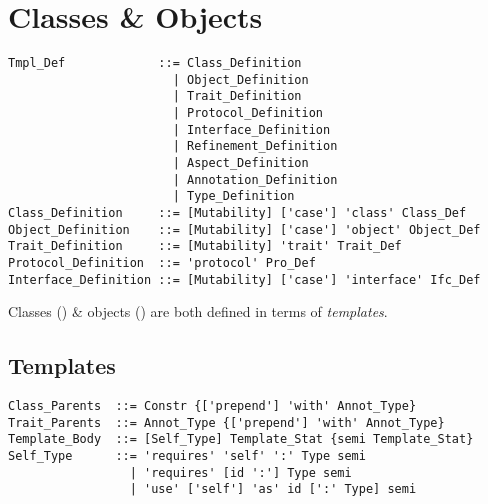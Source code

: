 
\chapter{Classes \& Objects}

\minitoc

\newpage

\syntax\begin{lstlisting}
Tmpl_Def             ::= Class_Definition
                       | Object_Definition
                       | Trait_Definition
                       | Protocol_Definition
                       | Interface_Definition
                       | Refinement_Definition
                       | Aspect_Definition
                       | Annotation_Definition
                       | Type_Definition
Class_Definition     ::= [Mutability] ['case'] 'class' Class_Def
Object_Definition    ::= [Mutability] ['case'] 'object' Object_Def
Trait_Definition     ::= [Mutability] 'trait' Trait_Def
Protocol_Definition  ::= 'protocol' Pro_Def
Interface_Definition ::= [Mutability] ['case'] 'interface' Ifc_Def
\end{lstlisting}

Classes () \& objects () are both defined in terms of {\em templates}. 





\section{Templates}
\label{sec:templates}

\syntax\begin{lstlisting}
Class_Parents  ::= Constr {['prepend'] 'with' Annot_Type} 
Trait_Parents  ::= Annot_Type {['prepend'] 'with' Annot_Type}
Template_Body  ::= [Self_Type] Template_Stat {semi Template_Stat}
Self_Type      ::= 'requires' 'self' ':' Type semi
                 | 'requires' [id ':'] Type semi
                 | 'use' ['self'] 'as' id [':' Type] semi
\end{lstlisting}

